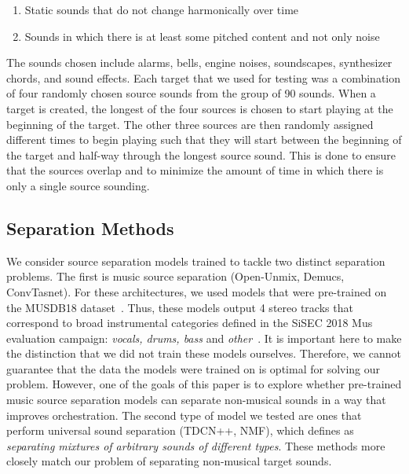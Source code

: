 \documentclass{article}
\begin{document}
    \begin{enumerate}
    	\item Static sounds that do not change harmonically over time
    	\item Sounds in which there is at least some pitched content and not only noise
    \end{enumerate}     
    The sounds chosen include alarms, bells, engine noises, soundscapes, synthesizer chords, and sound effects. Each target that we used for testing was a combination of four randomly chosen source sounds from the group of 90 sounds. 
    When a target is created, the longest of the four sources is chosen to start playing at the beginning of the target. The other three sources are then randomly assigned different times to begin playing such that they will start between the beginning of the target and half-way through the longest source sound. This is done to ensure that the sources overlap and to minimize the amount of time in which there is only a single source sounding. 
    
    \subsection{Separation Methods}
  We consider source separation models trained to tackle two distinct separation problems. The first is music source separation (Open-Unmix, Demucs, ConvTasnet). For these architectures, we used models that were pre-trained on the MUSDB18 dataset~\cite{MUSDB18}. Thus, these models output 4 stereo tracks that correspond to broad instrumental categories defined in the SiSEC 2018 Mus evaluation campaign: \textit{vocals, drums, bass} and \textit{other}~\cite{Stoter_SiSEC}. It is important here to make the distinction that we did not train these models ourselves. Therefore, we cannot guarantee that the data the models were trained on is optimal for solving our problem. However, one of the goals of this paper is to explore whether pre-trained music source separation models can separate non-musical sounds in a way that improves orchestration.
  The second type of model we tested are ones that perform universal sound separation (TDCN++, NMF), which \cite{tdcnpp} defines as \textit{separating mixtures of arbitrary sounds of different types}. These methods more closely match our problem of separating non-musical target sounds.
      
\end{document}
